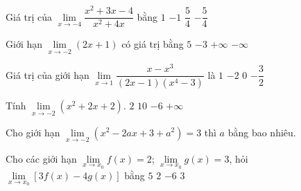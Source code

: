 \begin{ex}%
	Giá trị của $\lim \limits_{x  \rightarrow-4} \dfrac{x^2+3 x-4}{x^2+4 x}$ bằng
	\choice 
		{ $1$  }
		{$-1$  }
		{\True $\dfrac{5}{4}$} 
		{$-\dfrac{5}{4}$} 
\end{ex}

\begin{ex}%
	Giới  hạn $\lim\limits_{x \to -2}{(2x+1)}$ có giá trị bằng
	 \choice
		 {$5$}
		 {\True $-3$}
		{$+ \infty  $}
		 {$- \infty $}
\end{ex}

\begin{ex}%
	Giá trị của giới hạn $\lim\limits_{x\to 1}\dfrac{x-x^3}{(2x-1)(x^4-3)}$ là 
	 \choice
		 {$1$}
		{$-2$} 
		{\True $0$} 
		{$-\dfrac{3}{2}$} 
\end{ex}

\begin{ex}%
	 Tính $\lim\limits_{x\to -2}(x^2+2x+2)$.
	 \choice
		{\True $2$} 
		{$10$} 
		{$-6$} 
		{$+\infty$} 
\end{ex}

\begin{ex}%
	Cho giới hạn $\lim\limits_{x\to-2}\left(x^2-2 a  x+3+a^2\right)=3$ thì $a$ bằng bao nhiêu.
\end{ex}

\begin{ex}%
	Cho các giới hạn $\lim\limits_{x\to x_0}f(x)=2$; $\lim\limits_{x\to x_0}g(x)=3$, hỏi  $\lim\limits_{x\to x_0}[3f(x)-4g(x)]$ bằng
	\choice 
		 {$5$}
		{$2$} 
		{\True $-6$} 
		 {$3$}
\end{ex}

